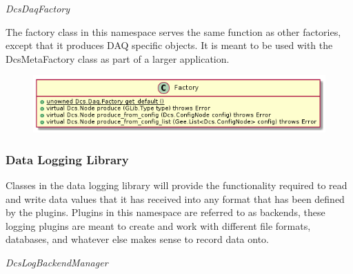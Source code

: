       \emph{DcsDaqFactory}

      \vspace*{-0.75cm}
      \begin{minipage}[t]{0.5\textwidth}
        \vspace*{0.5cm}
        The factory class in this namespace serves the same function as other
        factories, except that it produces DAQ specific objects. It is meant to
        be used with the DcsMetaFactory class as part of a larger application.
      \end{minipage} \hfill
      \begin{minipage}[t]{0.45\textwidth}
        \begin{figure}[H]
          \includegraphics[width=\textwidth]{figures/design/class/daq/factory}
          \label{fig:dsg-classes-daq-factory}
        \end{figure}
      \end{minipage}

    \subsubsection{Data Logging Library}\label{sec:dsg-classes-log}

      Classes in the data logging library will provide the functionality
      required to read and write data values that it has received into any
      format that has been defined by the plugins. Plugins in this namespace are
      referred to as backends, these logging plugins are meant to create and
      work with different file formats, databases, and whatever else makes sense
      to record data onto.

      \emph{DcsLogBackendManager}

